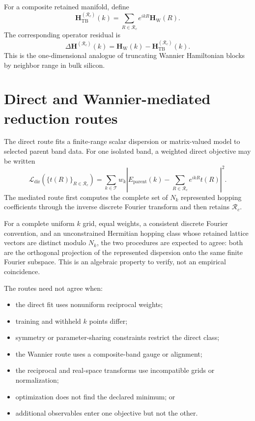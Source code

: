 For a composite retained manifold, define
\begin{equation}
    \mathbf H_{\mathrm{TB}}^{(\mathcal R_c)}(k)
    =
    \sum_{R\in\mathcal R_c}
    e^{ikR}\mathbf H_{\mathrm W}(R).
\end{equation}
The corresponding operator residual is
\begin{equation}
    \Delta\mathbf H^{(\mathcal R_c)}(k)
    =
    \mathbf H_{\mathrm W}(k)
    -
    \mathbf H_{\mathrm{TB}}^{(\mathcal R_c)}(k).
\end{equation}
This is the one-dimensional analogue of truncating Wannier Hamiltonian blocks
by neighbor range in bulk silicon.

\section*{Direct and Wannier-mediated reduction routes}

The direct route fits a finite-range scalar dispersion or matrix-valued model
to selected parent band data. For one isolated band, a weighted direct
objective may be written
\begin{equation}
    \mathcal L_{\mathrm{dir}}
    \left(\{t(R)\}_{R\in\mathcal R_c}\right)
    =
    \sum_{k\in\mathcal T}
    w_k
    \left|
        E_{\mathrm{parent}}(k)
        -
        \sum_{R\in\mathcal R_c}e^{ikR}t(R)
    \right|^2.
\end{equation}
The mediated route first computes the complete set of $N_k$ represented
hopping coefficients through the inverse discrete Fourier transform and then
retains $\mathcal R_c$.

For a complete uniform $k$ grid, equal weights, a consistent discrete Fourier
convention, and an unconstrained Hermitian hopping class whose retained lattice
vectors are distinct modulo $N_k$, the two procedures are expected to agree:
both are the orthogonal projection of the represented dispersion onto the same
finite Fourier subspace. This is an algebraic property
to verify, not an empirical coincidence.

The routes need not agree when:
\begin{itemize}
    \item the direct fit uses nonuniform reciprocal weights;
    \item training and withheld $k$ points differ;
    \item symmetry or parameter-sharing constraints restrict the direct class;
    \item the Wannier route uses a composite-band gauge or alignment;
    \item the reciprocal and real-space transforms use incompatible grids or
          normalization;
    \item optimization does not find the declared minimum; or
    \item additional observables enter one objective but not the other.
\end{itemize}

